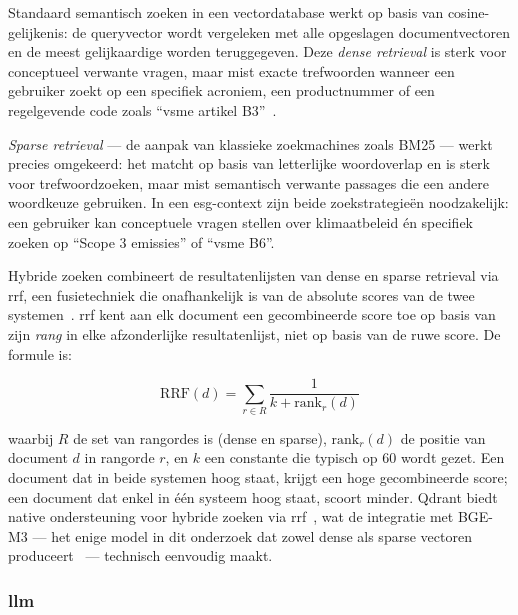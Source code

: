 Standaard semantisch zoeken in een vectordatabase werkt op basis van cosine-gelijkenis: de queryvector wordt vergeleken met alle opgeslagen documentvectoren en de meest gelijkaardige worden teruggegeven. Deze \textit{dense retrieval} is sterk voor conceptueel verwante vragen, maar mist exacte trefwoorden wanneer een gebruiker zoekt op een specifiek acroniem, een productnummer of een regelgevende code zoals ``\gls{vsme} artikel B3''~\autocite{Chen2024}.

\textit{Sparse retrieval} — de aanpak van klassieke zoekmachines zoals BM25 — werkt precies omgekeerd: het matcht op basis van letterlijke woordoverlap en is sterk voor trefwoordzoeken, maar mist semantisch verwante passages die een andere woordkeuze gebruiken. In een \gls{esg}-context zijn beide zoekstrategieën noodzakelijk: een gebruiker kan conceptuele vragen stellen over klimaatbeleid én specifiek zoeken op ``Scope 3 emissies'' of ``\gls{vsme} B6''.

Hybride zoeken combineert de resultatenlijsten van dense en sparse retrieval via \gls{rrf}, een fusietechniek die onafhankelijk is van de absolute scores van de twee systemen~\autocite{Cormack2009}. \gls{rrf} kent aan elk document een gecombineerde score toe op basis van zijn \emph{rang} in elke afzonderlijke resultatenlijst, niet op basis van de ruwe score. De formule is:

\begin{equation}
\text{RRF}(d) = \sum_{r \in R} \frac{1}{k + \text{rank}_r(d)}
\end{equation}

waarbij $R$ de set van rangordes is (dense en sparse), $\text{rank}_r(d)$ de positie van document $d$ in rangorde $r$, en $k$ een constante die typisch op 60 wordt gezet. Een document dat in beide systemen hoog staat, krijgt een hoge gecombineerde score; een document dat enkel in één systeem hoog staat, scoort minder. Qdrant biedt native ondersteuning voor hybride zoeken via \gls{rrf}~\autocite{QdrantHybrid2025}, wat de integratie met BGE-M3 — het enige model in dit onderzoek dat zowel dense als sparse vectoren produceert~\autocite{Chen2024} — technisch eenvoudig maakt.

\subsubsection{\gls{llm}}

